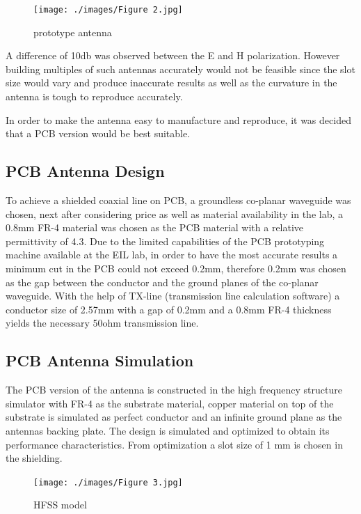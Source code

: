 \begin{figure}[h]
	\begin{center}
		\texttt{[image: ./images/Figure 2.jpg]}
		\caption{prototype antenna}
		\label{fig:hfield_fig2}
	\end{center}
\end{figure}

A difference of 10db was observed between the E and H polarization. However building multiples of such antennas accurately would not be feasible since the slot size would vary and produce inaccurate results as well as the curvature in the antenna is tough to reproduce accurately.

In order to make the antenna easy to manufacture and reproduce, it was decided that a PCB version would be best suitable.

\subsection{PCB Antenna Design}

To achieve a shielded coaxial line on PCB, a groundless co-planar waveguide was chosen, next after considering price as well as material availability in the lab, a 0.8mm FR-4 material was chosen as the PCB material with a relative permittivity of 4.3. Due to the limited capabilities of the PCB prototyping machine available at the EIL lab, in order to have the most accurate results a minimum cut in the PCB could not exceed 0.2mm, therefore 0.2mm was chosen as the gap between the conductor and the ground planes of the co-planar waveguide. With the help of TX-line (transmission line calculation software) a conductor size of 2.57mm with a gap of 0.2mm and a 0.8mm FR-4 thickness yields the necessary 50ohm transmission line.

\subsection{PCB Antenna Simulation}

The PCB version of the antenna is constructed in the high frequency structure simulator with FR-4 as the substrate material, copper material on top of the substrate is simulated as perfect conductor and an infinite ground plane as the antennas backing plate. The design is simulated and optimized to obtain its performance characteristics. From optimization a slot size of 1 mm is chosen in the shielding.

\begin{figure}[h]
	\begin{center}
		\texttt{[image: ./images/Figure 3.jpg]}
		\caption{HFSS model}
		\label{fig:hfield_fig3}
	\end{center}
\end{figure}

